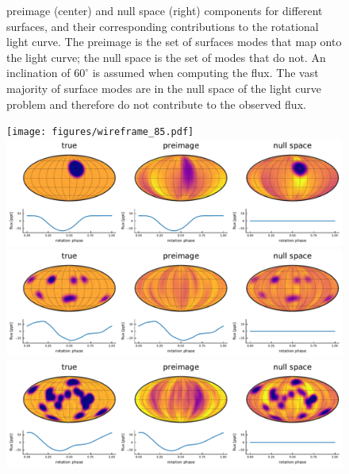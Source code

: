 \documentclass[modern]{aastex62}
\begin{document}
\begin{figure}[p!]
\begin{centering}
{            preimage (center) and null space (right) components
            for different surfaces, and their corresponding contributions
            to the rotational light curve. The preimage is the
            set of surfaces modes that map onto the light curve;
            the null space is the set of modes that do not.
            An inclination of $60^\circ$ is assumed when computing the flux.
            The vast majority of surface modes are in the null space
            of the light curve problem and therefore do not contribute
            to the observed flux.
            \label{fig:nullspace_preimage}
        }
    \end{centering}
\end{figure}

\begin{figure}[p!]
    \begin{centering}
        \vspace{-4em}
        \texttt{[image: figures/wireframe\_85.pdf]}
        \\[0.5em]
        \includegraphics[width=\linewidth]{figures/nullspace_preimage_85a.pdf}
        \\[1em]
        \includegraphics[width=\linewidth]{figures/nullspace_preimage_85b.pdf}
        \\[1em]
        \includegraphics[width=\linewidth]{figures/nullspace_preimage_85c.pdf}

\end{centering}
\end{figure}
\end{document}
